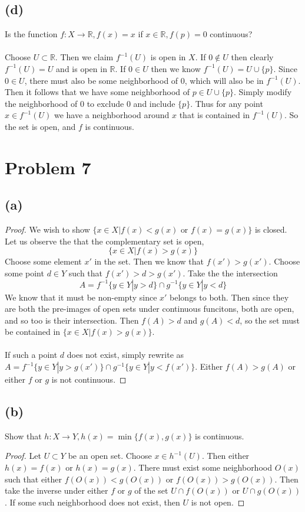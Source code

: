 \documentclass{article}
\theoremstyle{definition}
\begin{document}
    \subsection*{(d)}
    Is the function $f:X \rightarrow \mathbb{R}, f(x) = x$ if $x \in \mathbb{R}, f(p) = 0$ continuous?\\\\
    Choose $U \subset \mathbb{R}$. Then we claim $f^{-1}(U)$ is open in $X$.
    If $0 \notin U$ then clearly $f^{-1}(U) = U$ and is open in $\mathbb{R}$.
    If $0 \in U$ then we know $f^{-1}(U) = U \cup \{p \}$. Since $0 \in U$, there must also be some neighborhood of 0, which will also be in $f^{-1}(U)$.
    Then it follows that we have some neighborhood of $p \in U \cup \{p\}$. Simply modify the neighborhood of $0$ to exclude 0 and include $\{p\}$.
    Thus for any point $x \in f^{-1}(U)$ we have a neighborhood around $x$ that is contained in $f^{-1}(U)$. So the set is open, and $f$ is continuous.
\section*{Problem 7}
    \subsection*{(a)}
    \begin{proof}
        We wish to show $\{x \in X| f(x) < g(x) \text{ or } f(x) = g(x) \}$ is closed.
        Let us observe the that the complementary set is open, 
        \[ \{x \in X | f(x) > g(x)\} \]
        Choose some element $x'$ in the set.
        Then we know that $f(x') > g(x')$.
        Choose some point $d \in Y$ such that $f(x') > d > g(x')$.
        Take the the intersection
        \[
            A = f^{-1}\{y \in Y | y > d\} \cap g^{-1}\{y \in Y | y < d\}
        \]
        We know that it must be non-empty since $x'$ belongs to both.
        Then since they are both the pre-images of open sets under continuous funcitons,
        both are open, and so too is their intersection. Then $f(A) > d$ and $g(A) < d$,
        so the set must be contained in $\{x \in X | f(x) > g(x)\}$.
        \\\\
        If such a point $d$ does not exist, simply rewrite as $A = f^{-1}\{y \in Y | y > g(x')\} \cap g^{-1}\{y \in Y| y < f(x')\}$.
        Either $f(A) > g(A)$ or either $f$ or $g$ is not continuous.
    \end{proof}
    \subsection*{(b)}
    Show that $h: X \rightarrow Y, h(x) = \min\{f(x), g(x)\}$ is continuous.
    \begin{proof}
        Let $U \subset Y$ be an open set.
        Choose $x \in h^{-1}(U)$. Then either $h(x) = f(x)$ or $h(x) = g(x)$.
        There must exist some neighborhood $O(x)$ such that either $f(O(x)) < g(O(x))$ or $f(O(x)) > g(O(x))$.
        Then take the inverse under either $f$ or $g$ of the set $U \cap f(O(x))$ or $U \cap g(O(x))$.
        If some such neighborhood does not exist, then $U$ is not open.
    \end{proof}
\end{document}
